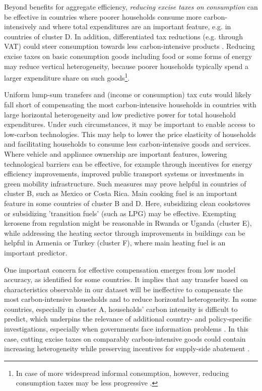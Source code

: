\documentclass[12pt, a4paper]{article}
\begin{document}
Beyond benefits for aggregate efficiency, \textit{reducing excise taxes on consumption} can be effective in countries where poorer households consume more carbon-intensively and where total expenditures are an important feature, e.g. in countries of cluster D. In addition, differentiated tax reductions (e.g. through VAT) could steer consumption towards less carbon-intensive products \autocite{Klenert.2023}. Reducing excise taxes on basic consumption goods including food or some forms of energy may reduce vertical heterogeneity, because poorer households typically spend a larger expenditure share on such goods\footnote{In case of more widespread informal consumption, however, reducing consumption taxes may be less progressive \autocite{Bachas.2020}.}. 

Uniform lump-sum transfers and (income or consumption) tax cuts would likely fall short of compensating the most carbon-intensive households in countries with large horizontal heterogeneity and low predictive power for total household expenditures. Under such circumstances, it may be important to enable access to low-carbon technologies. This may help to lower the price elasticity of households and facilitating households to consume less carbon-intensive goods and services. Where vehicle and appliance ownership are important features, lowering technological barriers can be effective, for example through incentives for energy efficiency improvements, improved public transport systems or investments in green mobility infrastructure. Such measures may prove helpful in countries of cluster B, such as Mexico or Costa Rica. %
Main cooking fuel is an important feature in some countries of cluster B and D. Here, subsidizing clean cookstoves or subsidizing 'transition fuels' (such as LPG) may be effective. Exempting kerosene from regulation might be reasonable in Rwanda or Uganda (cluster E), while addressing the heating sector through improvements in buildings can be helpful in Armenia or Turkey (cluster F), where main heating fuel is an important predictor. %

One important concern for effective compensation emerges from low model accuracy, as identified for some countries. It implies that any transfer based on characteristics observable in our dataset will be ineffective to compensate the most carbon-intensive households and to reduce horizontal heterogeneity. In some countries, especially in cluster A, households' carbon intensity is difficult to predict, which underpins the relevance of additional country- and policy-specific investigations, especially when governments face information problems \autocite{Mirrlees.1971}. In this case, cutting excise taxes on comparably carbon-intensive goods could contain increasing heterogeneity while preserving incentives for supply-side abatement \autocite{Goulder.2008}.
\end{document}
